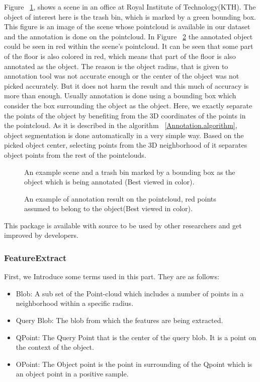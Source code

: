 Figure ~\ref{TrashbinBounding.figure}, shows a scene in an office at Royal Institute of Technology(KTH). 
The object of interest here is the trash bin, which is marked by a green bounding box. 
This figure is an image of the scene whose pointcloud is available in our dataset and the annotation is done on 
the pointcloud. 
In Figure ~\ref{Annotation.figure} the annotated object could be seen in red within the scene's pointcloud.
It can be seen that some part of the floor is also colored in red, which means that part of the floor is also 
annotated as the object.
The reason is the object radius, that is given to annotation tool was not accurate enough or the center of the 
object was not picked accurately.
But it does not harm the result and this much of accuracy is more than enough.
Usually annotation is done using a bounding box which consider the box surrounding the object as the object.
Here, we exactly separate the points of the object by benefiting from the 3D coordinates of the points in the 
pointcloud.
As it is described in the algorithm ~\ref{Annotation.algorithm}, object segmentation is done automatically in a very 
simple way.
Based on the picked object center, selecting points from the 3D neighborhood of it separates object points from the 
rest of the pointclouds.

\begin{figure}[t]
  \caption[Example scene and object for Annotation tool]
  {An example scene and a trash bin marked by a bounding box as the object which is being annotated (Best viewed in color).}
  \label{TrashbinBounding.figure}
\end{figure}

\begin{figure}[t]
  \caption[Annotation tool result]
  {An example of annotation result on the pointcloud, red points assumed to belong to the object(Best viewed in color).}
  \label{Annotation.figure}
\end{figure}

This package is available with source to be used by other researchers and get improved by developers.\cite{AnnotationGithub}


\subsubsection{FeatureExtract}
\label{FeatureExtract.ssec}
First, we Introduce some terms used in this part. They are as follows:
\begin{itemize}
  \item Blob: A sub set of the Point-cloud which includes a number of points in a neighborhood within a specific radius.
  \item Query Blob: The blob from which the features are being extracted.
  \item QPoint: The Query Point that is the center of the query blob. It is a point on the context of the object.
  \item OPoint: The Object point is the point in surrounding of the Qpoint which is an object point in a positive sample.
 \end{itemize}
 
